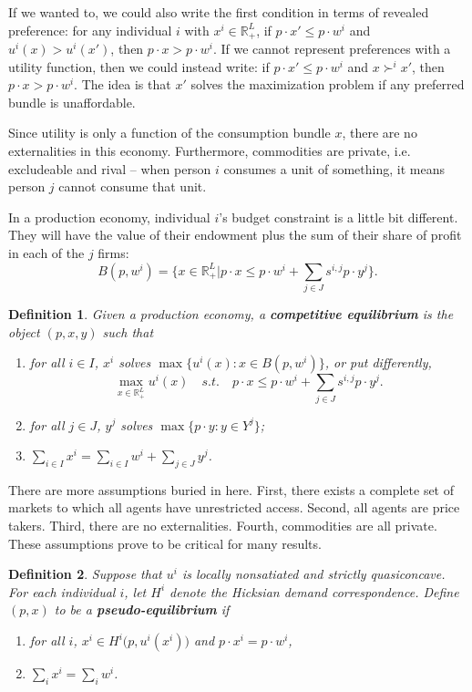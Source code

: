 \documentclass[11pt, twocolumn]{article}
\newcommand{\R}{\mathbb{R}}
\newtheorem{definition}{Definition}
\theoremstyle{definition}
\begin{document}
If we wanted to, we could also write the first condition in terms of revealed preference: for any individual $i$ with $x^i \in \R^L_+$, if $p \cdot x' \leq p\cdot w^i$ and $u^i(x) > u^i(x')$, then $p\cdot x > p \cdot w^i$. If we cannot represent preferences with a utility function, then we could instead write: if $p \cdot x' \leq p\cdot w^i$ and $x \succ^i x'$, then $p\cdot x > p \cdot w^i$. The idea is that $x'$ solves the maximization problem if any preferred bundle is unaffordable. 

Since utility is only a function of the consumption bundle $x$, there are no externalities in this economy. Furthermore, commodities are private, i.e. excludeable and rival -- when person $i$ consumes a unit of something, it means person $j$ cannot consume that unit. 

In a production economy, individual $i$'s budget constraint is a little bit different. They will have the value of their endowment plus the sum of their share of profit in each of the $j$ firms:
	\[ B(p,w^i) = \{ x \in \R^L_+ | p \cdot x \leq p \cdot w^i + \sum_{j \in J} s^{i,j} p \cdot y^j \}. 	\]

\begin{definition}
	Given a production economy, a \textbf{competitive equilibrium} is the object $(p,x,y)$ such that
	\begin{enumerate}
		\item for all $i \in I$, $x^i$ solves $\max \{u^i(x) : x \in B(p,w^i) \}$, or put differently,
		\[\max_{x \in \R^L_+} u^i(x) \quad s.t. \quad p \cdot x \leq p \cdot w^i + \sum_{j \in J} s^{i,j}p \cdot y^j.	\]
		\item for all $j \in J$, $y^j$ solves $\max\{p \cdot y : y \in Y^j\}$;
		\item $\sum_{i \in I}x^i = \sum_{i \in I}w^i + \sum_{j \in J} y^j$.
	\end{enumerate}
\end{definition}

There are more assumptions buried in here. First, there exists a complete set of markets to which all agents have unrestricted access. Second, all agents are price takers. Third, there are no externalities. Fourth, commodities are all private. These assumptions prove to be critical for many results. 



\begin{definition}
	Suppose that $u^i$ is locally nonsatiated and strictly quasiconcave. For each individual $i$, let $H^i$ denote the Hicksian demand correspondence. Define $(p,x)$ to be a \textbf{pseudo-equilibrium} if
	\begin{enumerate}[label=\roman*.]
	\item for all $i$, $x^i \in H^i\big(p, u^i(x^i)\big)$ and $p \cdot x^i = p \cdot w^i$,
	\item $\sum_i x^i = \sum_i w^i$. 
	\end{enumerate}
\end{definition}
\end{document}
